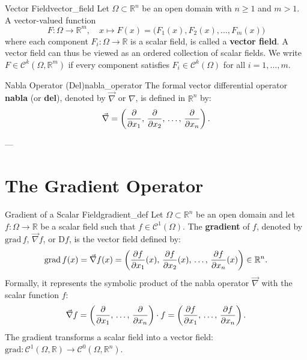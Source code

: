 \begin{definition}{Vector Field}{vector_field}
Let $\Omega \subset \mathbb{R}^n$ be an open domain with $n \ge 1$ and $m > 1$. A vector-valued function
\begin{equation}
    F : \Omega \longrightarrow \mathbb{R}^m, \quad x \longmapsto F(x) = \big(F_1(x), F_2(x), \dots, F_m(x)\big)
\end{equation}
where each component $F_i : \Omega \to \mathbb{R}$ is a scalar field, is called a \textbf{vector field}. A vector field can thus be viewed as an ordered collection of scalar fields. We write $F \in \mathcal{C}^k(\Omega, \mathbb{R}^m)$ if every component satisfies $F_i \in \mathcal{C}^k(\Omega)$ for all $i = 1, \dots, m$.
\end{definition}

\begin{definition}{Nabla Operator (Del)}{nabla_operator}
The formal vector differential operator \textbf{nabla} (or \textbf{del}), denoted by $\vec{\nabla}$ or $\nabla$, is defined in $\mathbb{R}^n$ by:
\begin{equation}
    \vec{\nabla} = \left( \pdv{}{x_1}, \, \pdv{}{x_2}, \, \dots, \, \pdv{}{x_n} \right).
\end{equation}
\end{definition}

---

\section{The Gradient Operator}

\begin{definition}{Gradient of a Scalar Field}{gradient_def}
Let $\Omega \subset \mathbb{R}^n$ be an open domain and let $f : \Omega \to \mathbb{R}$ be a scalar field such that $f \in \mathcal{C}^1(\Omega)$. The \textbf{gradient} of $f$, denoted by $\mathrm{grad}\,f$, $\vec{\nabla} f$, or $\mathrm{D}f$, is the vector field defined by:
\begin{equation}
    \mathrm{grad}\,f(x) = \vec{\nabla} f(x) = \left( \pdv{f}{x_1}(x), \, \pdv{f}{x_2}(x), \, \dots, \, \pdv{f}{x_n}(x) \right) \in \mathbb{R}^n.
\end{equation}
Formally, it represents the symbolic product of the nabla operator $\vec{\nabla}$ with the scalar function $f$:
\begin{equation}
    \vec{\nabla} f = \left( \pdv{}{x_1}, \, \dots, \, \pdv{}{x_n} \right) \cdot f = \left( \pdv{f}{x_1}, \, \dots, \, \pdv{f}{x_n} \right).
\end{equation}
The gradient transforms a scalar field into a vector field: $\mathrm{grad} : \mathcal{C}^1(\Omega, \mathbb{R}) \to \mathcal{C}^0(\Omega, \mathbb{R}^n)$.
\end{definition}

